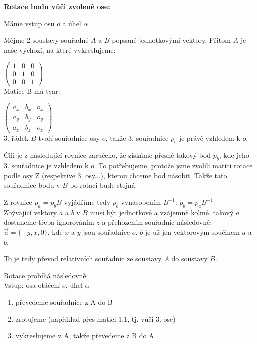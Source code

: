 \documentclass[a4paper,12pt]{report}
\begin{document}
\textbf{Rotace bodu vůči zvolené ose:}\cite{rotace}

Máme vstup osu $o$ a úhel $\alpha$. 

Mějme 2 soustavy souřadné $A$ a $B$ popsané jednotkovými vektory. Přitom $A$ je naše výchozí, na které vykreslujeme:

$\begin{pmatrix}
1 & 0 & 0\\
0 & 1 & 0\\
0 & 0 & 1
\end{pmatrix}$\\

Matice B má tvar:

$\begin{pmatrix}
a_x& b_x& o_x\\
a_y & b_y& o_y\\
a_z & b_z & o_z
\end{pmatrix}$\\

3. řádek $B$ tvoří souřadnice osy $o$, takže 3. souřadnice $p_b$ je právě vzhledem k $o$.

Čili je z následující rovnice zaručeno, že získáme přesně takový bod $p_b$, kde jeho 3. souřadnice je vzhledem k $o$. To potřebujeme, protože jsme zvolili matici
rotace podle osy Z (respektive 3. osy...), kterou chceme bod násobit. Takže tato souřadnice bodu v $B$ po rotaci bude stejná.

Z rovnice $p_a = p_b B$ vyjádříme tedy $p_b$ vynasobením $B^{-1}$: $p_b = p_a B^{-1}$\\ %


Zbývající vektory $a$ a $b$ v $B$ musí být jednotkové a vzájemně kolmé. takový $a$ dostaneme třeba ignorováním $z$ a přehozením souřadnic následovně: $\vec{a} = \{-y, x, 0\}$, kde $x$ a $y$ jsou souřadnice $o$. $b$ je už jen vektorovým součinem $a$ a $b$.

To je tedy převod relativních souřadnic ze soustavy $A$ do soustavy $B$.




Rotace probíhá následovně:\\

Vstup: osa otáčení $o$, úhel $\alpha$

\begin{enumerate}[label=\arabic*, font=\bfseries] %
	\item převedeme souřadnice z A do B
	\item zrotujeme (například přes matici 1.1, tj. vůči 3. ose)
	\item vykreslujeme v A, takže převedeme z B do A
\end{enumerate}
\end{document}
